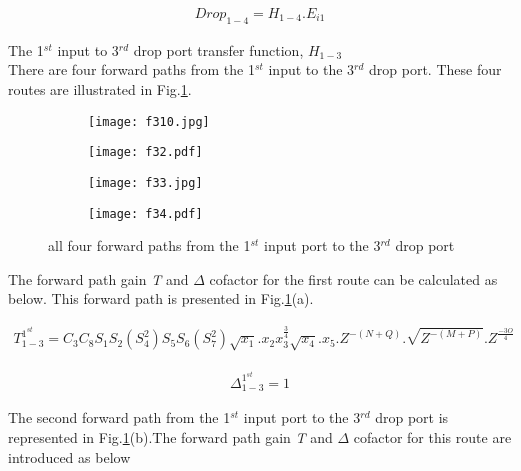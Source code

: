 \documentclass{osa-article}
\begin{document}
\begin{equation}
\begin{split}
Drop_{1-4}=H_{1-4}.E_{i1}
\end{split}
\end{equation}

The 1$^{st}$ input to 3$^{rd}$ drop port transfer function, $H_{1-3}$\\

There are four forward paths from the 1$^{st}$ input to the 3$^{rd}$ drop port.  These four routes are illustrated in Fig.\ref{figa4}.
\begin{figure}[h!]
  \centering
  \begin{subfigure}[b]{0.4\linewidth}
    \texttt{[image: f310.jpg]}
    \caption{}
  \end{subfigure}
  \begin{subfigure}[b]{0.4\linewidth}
    \texttt{[image: f32.pdf]}
    \caption{}
  \end{subfigure}
  \begin{subfigure}[b]{0.4\linewidth}
    \texttt{[image: f33.jpg]}
    \caption{}
  \end{subfigure}
  \begin{subfigure}[b]{0.4\linewidth}
    \texttt{[image: f34.pdf]}
    \caption{}
  \end{subfigure}
  \caption{all four forward paths from the 1$^{st}$ input port to the 3$^{rd}$ drop port}
  \label{figa4}
\end{figure}
The forward path gain \textit {T} and $\Delta$ cofactor for the first route can be calculated as below. This forward path is presented in Fig.\ref{figa4}(a).

\begin{equation}
\begin{split}
T^{1^{st}}_{1-3}=C_3C_8S_1S_2(S^2_4)S_5S_6(S^2_7)\sqrt{x_1}.x_{2}{x^{\frac{3}{4}}_3}\sqrt{x_4}.x_{5}.Z^{-(N+Q)}.\sqrt{Z^{-(M+P)}}.Z^{\frac{-3O}{4}}
\end{split}
\end{equation}

\begin{equation}
\begin{split}
\Delta^{1^{st}}_{1-3}=1
\end{split}
\end{equation}

The second forward path from the 1$^{st}$ input port to the 3$^{rd}$ drop port is represented in Fig.\ref{figa4}(b).The forward path gain \textit {T} and $\Delta$ cofactor for this route are introduced as below
\end{document}
